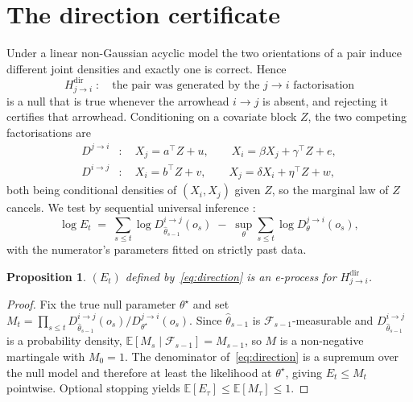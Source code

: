 \documentclass[11pt,a4paper]{article}
\newtheorem{proposition}[theorem]{Proposition}
\theoremstyle{definition}
\theoremstyle{remark}
\begin{document}
\section{The direction certificate}
\label{sec:direction}

Under a linear non-Gaussian acyclic model \citep{shimizu2006linear} the two
orientations of a pair induce different joint densities and exactly one is
correct. Hence
\begin{equation}
H^{\mathrm{dir}}_{j \to i} \;:\quad
\text{the pair was generated by the } j \to i \text{ factorisation}
\end{equation}
is a null that is true whenever the arrowhead $i \to j$ is absent, and rejecting
it certifies that arrowhead. Conditioning on a covariate block $Z$, the two
competing factorisations are
\begin{align}
D^{j \to i} &: \quad X_j = a^\top Z + u, \qquad X_i = \beta X_j + \gamma^\top Z + e, \\
D^{i \to j} &: \quad X_i = b^\top Z + v, \qquad X_j = \delta X_i + \eta^\top Z + w,
\end{align}
both being conditional densities of $(X_i, X_j)$ given $Z$, so the marginal law
of $Z$ cancels. We test by sequential universal inference
\citep{wasserman2020universal}:
\begin{equation}
\label{eq:direction}
\log E_t \;=\; \sum_{s \le t} \log D^{i \to j}_{\hat\theta_{s-1}}(o_s)
\;-\; \sup_{\theta} \sum_{s \le t} \log D^{j \to i}_{\theta}(o_s),
\end{equation}
with the numerator's parameters fitted on strictly past data.

\begin{proposition}
\label{prop:direction}
$(E_t)$ defined by~\eqref{eq:direction} is an e-process for
$H^{\mathrm{dir}}_{j \to i}$.
\end{proposition}

\begin{proof}
Fix the true null parameter $\theta^\star$ and set
$M_t = \prod_{s \le t} D^{i \to j}_{\hat\theta_{s-1}}(o_s) /
D^{j \to i}_{\theta^\star}(o_s)$. Since $\hat\theta_{s-1}$ is
$\mathcal{F}_{s-1}$-measurable and $D^{i \to j}_{\hat\theta_{s-1}}$ is a
probability density, $\mathbb{E}[M_s \mid \mathcal{F}_{s-1}] = M_{s-1}$, so $M$
is a non-negative martingale with $M_0 = 1$. The denominator
of~\eqref{eq:direction} is a supremum over the null model and therefore at
least the likelihood at $\theta^\star$, giving $E_t \le M_t$ pointwise.
Optional stopping yields
$\mathbb{E}[E_\tau] \le \mathbb{E}[M_\tau] \le 1$.
\end{proof}
\end{document}
